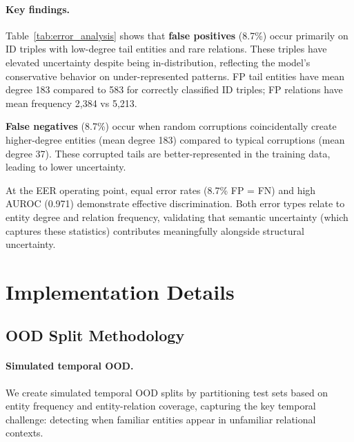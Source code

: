 \documentclass{article}
\begin{document}
\paragraph{Key findings.}
Table~\ref{tab:error_analysis} shows that \textbf{false positives} (8.7\%) occur primarily on ID triples with low-degree tail entities and rare relations.
These triples have elevated uncertainty despite being in-distribution, reflecting the model's conservative behavior on under-represented patterns.
FP tail entities have mean degree 183 compared to 583 for correctly classified ID triples; FP relations have mean frequency 2,384 vs 5,213.

\textbf{False negatives} (8.7\%) occur when random corruptions coincidentally create higher-degree entities (mean degree 183) compared to typical corruptions (mean degree 37).
These corrupted tails are better-represented in the training data, leading to lower uncertainty.

At the EER operating point, equal error rates (8.7\% FP = FN) and high AUROC (0.971) demonstrate effective discrimination.
Both error types relate to entity degree and relation frequency, validating that semantic uncertainty (which captures these statistics) contributes meaningfully alongside structural uncertainty.

\section{Implementation Details}
\label{app:implementation}

\subsection{OOD Split Methodology}
\label{app:ood_splits}

\paragraph{Simulated temporal OOD.}
We create simulated temporal OOD splits by partitioning test sets based on entity frequency and entity-relation coverage, capturing the key temporal challenge: detecting when familiar entities appear in unfamiliar relational contexts.
\end{document}
